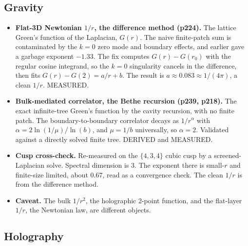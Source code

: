 \subsection{Gravity}

\begin{itemize}
  \item \textbf{Flat-3D Newtonian $1/r$, the difference method (p224).} The lattice Green's function of the
  Laplacian, $G(r)$. The naive finite-patch sum is contaminated by the $k = 0$ zero mode and boundary effects, and
  earlier gave a garbage exponent $-1.33$. The fix computes $G(r) - G(r_0)$ with the regular cosine integrand, so
  the $k = 0$ singularity cancels in the difference, then fits $G(r) - G(2) = a/r + b$. The result is
  $a \approx 0.083 \approx 1/(4\pi)$, a clean $1/r$. MEASURED.
  \item \textbf{Bulk-mediated correlator, the Bethe recursion (p239, p218).} The exact infinite-tree Green's
  function by the cavity recursion, with no finite patch. The boundary-to-boundary correlator decays as
  $1/r^\alpha$ with $\alpha = 2\ln(1/\mu)/\ln(b)$, and $\mu = 1/b$ universally, so $\alpha = 2$. Validated against
  a directly solved finite tree. DERIVED and MEASURED.
  \item \textbf{Cusp cross-check.} Re-measured on the $\{4,3,4\}$ cubic cusp by a screened-Laplacian solve.
  Spectral dimension is 3. The exponent there is small-$r$ and finite-size limited, about $0.67$, read as a
  convergence check. The clean $1/r$ is from the difference method.
  \item \textbf{Caveat.} The bulk $1/r^2$, the holographic 2-point function, and the flat-layer $1/r$, the
  Newtonian law, are different objects.
\end{itemize}

\subsection{Holography}

